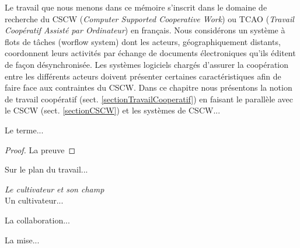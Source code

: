 \label{chapEtatDeLart}

Le travail que nous menons dans ce mémoire s'inscrit dans le domaine de recherche du CSCW (\textit{Computer Supported Cooperative Work}) ou TCAO (\textit{Travail Coopératif Assisté par Ordinateur}) en français. Nous considérons un système à flots de tâches (worflow system) dont les acteurs, géographiquement distants, coordonnent leurs activités par échange de documents électroniques qu'ils éditent de façon désynchronisée. Les systèmes logiciels chargés d'assurer la coopération entre les différents acteurs doivent présenter certaines caractéristiques afin de faire face aux contraintes du CSCW. Dans ce chapitre nous présentons la notion de travail coopératif (sect. \ref{sectionTravailCooperatif}) en faisant le parallèle avec le CSCW (sect. \ref{sectionCSCW}) et les systèmes de CSCW...


\label{sectionTravailCooperatif}
Le terme...
\begin{proof}
La preuve
\end{proof}

\label{sectionOrganisationTravail}
Sur le plan du travail...

\begin{example}\textit{Le cultivateur et son champ}\\
Un cultivateur...
\end{example}

\label{sectionCSCW}
La collaboration...

\label{sectionCaractSystCSCW}
La mise...


